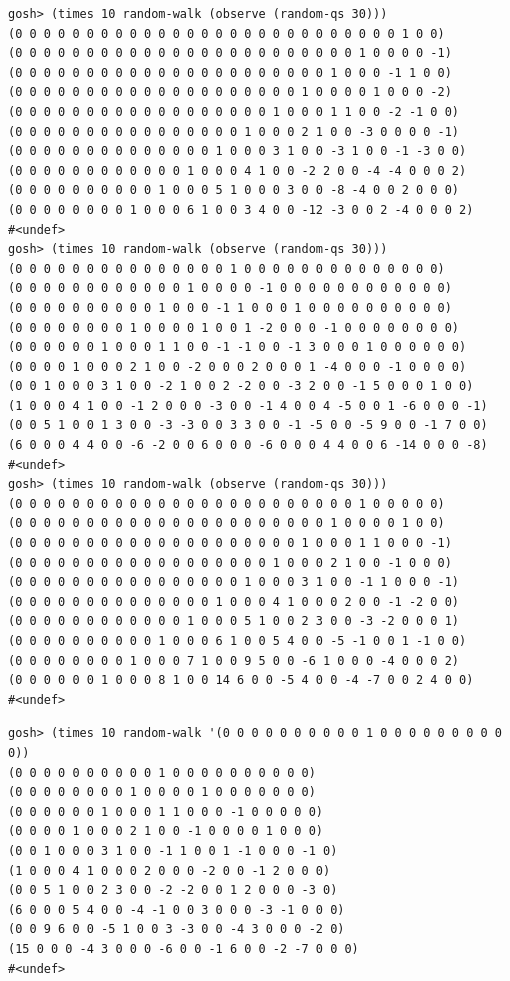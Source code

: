 \begin{verbatim}
gosh> (times 10 random-walk (observe (random-qs 30)))
(0 0 0 0 0 0 0 0 0 0 0 0 0 0 0 0 0 0 0 0 0 0 0 0 0 0 0 1 0 0)
(0 0 0 0 0 0 0 0 0 0 0 0 0 0 0 0 0 0 0 0 0 0 0 0 1 0 0 0 0 -1)
(0 0 0 0 0 0 0 0 0 0 0 0 0 0 0 0 0 0 0 0 0 0 1 0 0 0 -1 1 0 0)
(0 0 0 0 0 0 0 0 0 0 0 0 0 0 0 0 0 0 0 0 1 0 0 0 0 1 0 0 0 -2)
(0 0 0 0 0 0 0 0 0 0 0 0 0 0 0 0 0 0 1 0 0 0 1 1 0 0 -2 -1 0 0)
(0 0 0 0 0 0 0 0 0 0 0 0 0 0 0 0 1 0 0 0 2 1 0 0 -3 0 0 0 0 -1)
(0 0 0 0 0 0 0 0 0 0 0 0 0 0 1 0 0 0 3 1 0 0 -3 1 0 0 -1 -3 0 0)
(0 0 0 0 0 0 0 0 0 0 0 0 1 0 0 0 4 1 0 0 -2 2 0 0 -4 -4 0 0 0 2)
(0 0 0 0 0 0 0 0 0 0 1 0 0 0 5 1 0 0 0 3 0 0 -8 -4 0 0 2 0 0 0)
(0 0 0 0 0 0 0 0 1 0 0 0 6 1 0 0 3 4 0 0 -12 -3 0 0 2 -4 0 0 0 2)
#<undef>
gosh> (times 10 random-walk (observe (random-qs 30)))
(0 0 0 0 0 0 0 0 0 0 0 0 0 0 0 1 0 0 0 0 0 0 0 0 0 0 0 0 0 0)
(0 0 0 0 0 0 0 0 0 0 0 0 1 0 0 0 0 -1 0 0 0 0 0 0 0 0 0 0 0 0)
(0 0 0 0 0 0 0 0 0 0 1 0 0 0 -1 1 0 0 0 1 0 0 0 0 0 0 0 0 0 0)
(0 0 0 0 0 0 0 0 1 0 0 0 0 1 0 0 1 -2 0 0 0 -1 0 0 0 0 0 0 0 0)
(0 0 0 0 0 0 1 0 0 0 1 1 0 0 -1 -1 0 0 -1 3 0 0 0 1 0 0 0 0 0 0)
(0 0 0 0 1 0 0 0 2 1 0 0 -2 0 0 0 2 0 0 0 1 -4 0 0 0 -1 0 0 0 0)
(0 0 1 0 0 0 3 1 0 0 -2 1 0 0 2 -2 0 0 -3 2 0 0 -1 5 0 0 0 1 0 0)
(1 0 0 0 4 1 0 0 -1 2 0 0 0 -3 0 0 -1 4 0 0 4 -5 0 0 1 -6 0 0 0 -1)
(0 0 5 1 0 0 1 3 0 0 -3 -3 0 0 3 3 0 0 -1 -5 0 0 -5 9 0 0 -1 7 0 0)
(6 0 0 0 4 4 0 0 -6 -2 0 0 6 0 0 0 -6 0 0 0 4 4 0 0 6 -14 0 0 0 -8)
#<undef>
gosh> (times 10 random-walk (observe (random-qs 30)))
(0 0 0 0 0 0 0 0 0 0 0 0 0 0 0 0 0 0 0 0 0 0 0 0 1 0 0 0 0 0)
(0 0 0 0 0 0 0 0 0 0 0 0 0 0 0 0 0 0 0 0 0 0 1 0 0 0 0 1 0 0)
(0 0 0 0 0 0 0 0 0 0 0 0 0 0 0 0 0 0 0 0 1 0 0 0 1 1 0 0 0 -1)
(0 0 0 0 0 0 0 0 0 0 0 0 0 0 0 0 0 0 1 0 0 0 2 1 0 0 -1 0 0 0)
(0 0 0 0 0 0 0 0 0 0 0 0 0 0 0 0 1 0 0 0 3 1 0 0 -1 1 0 0 0 -1)
(0 0 0 0 0 0 0 0 0 0 0 0 0 0 1 0 0 0 4 1 0 0 0 2 0 0 -1 -2 0 0)
(0 0 0 0 0 0 0 0 0 0 0 0 1 0 0 0 5 1 0 0 2 3 0 0 -3 -2 0 0 0 1)
(0 0 0 0 0 0 0 0 0 0 1 0 0 0 6 1 0 0 5 4 0 0 -5 -1 0 0 1 -1 0 0)
(0 0 0 0 0 0 0 0 1 0 0 0 7 1 0 0 9 5 0 0 -6 1 0 0 0 -4 0 0 0 2)
(0 0 0 0 0 0 1 0 0 0 8 1 0 0 14 6 0 0 -5 4 0 0 -4 -7 0 0 2 4 0 0)
#<undef>
\end{verbatim}

\begin{verbatim}
gosh> (times 10 random-walk '(0 0 0 0 0 0 0 0 0 0 1 0 0 0 0 0 0 0 0 0 0))
(0 0 0 0 0 0 0 0 0 0 1 0 0 0 0 0 0 0 0 0 0)
(0 0 0 0 0 0 0 0 1 0 0 0 0 1 0 0 0 0 0 0 0)
(0 0 0 0 0 0 1 0 0 0 1 1 0 0 0 -1 0 0 0 0 0)
(0 0 0 0 1 0 0 0 2 1 0 0 -1 0 0 0 0 1 0 0 0)
(0 0 1 0 0 0 3 1 0 0 -1 1 0 0 1 -1 0 0 0 -1 0)
(1 0 0 0 4 1 0 0 0 2 0 0 0 -2 0 0 -1 2 0 0 0)
(0 0 5 1 0 0 2 3 0 0 -2 -2 0 0 1 2 0 0 0 -3 0)
(6 0 0 0 5 4 0 0 -4 -1 0 0 3 0 0 0 -3 -1 0 0 0)
(0 0 9 6 0 0 -5 1 0 0 3 -3 0 0 -4 3 0 0 0 -2 0)
(15 0 0 0 -4 3 0 0 0 -6 0 0 -1 6 0 0 -2 -7 0 0 0)
#<undef>
\end{verbatim}


